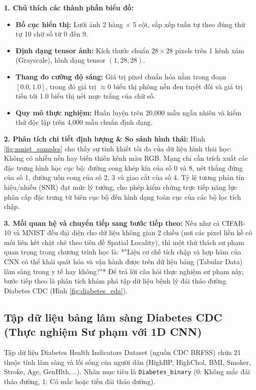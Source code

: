 \documentclass[12pt,a4paper]{article}
\begin{document}
\begin{chartbox}[title={Chú thích \& Phân tích chuyên sâu Mẫu dữ liệu MNIST (Hình \ref{fig:mnist_samples})}]
\textbf{\color{blue!80!black}1. Chú thích các thành phần biểu đồ:}
\begin{itemize}[noitemsep,topsep=1pt,leftmargin=15pt]
    \item \textbf{Bố cục hiển thị:} Lưới ảnh 2 hàng $\times$ 5 cột, sắp xếp tuần tự theo đúng thứ tự 10 chữ số từ 0 đến 9.
    \item \textbf{Định dạng tensor ảnh:} Kích thước chuẩn $28 \times 28$ pixels trên 1 kênh xám (Grayscale), hình dạng tensor $(1, 28, 28)$.
    \item \textbf{Thang đo cường độ sáng:} Giá trị pixel chuẩn hóa nằm trong đoạn $[0.0, 1.0]$, trong đó giá trị $\approx 0$ biểu thị phông nền đen tuyệt đối và giá trị tiến tới 1.0 biểu thị nét mực trắng của chữ số.
    \item \textbf{Quy mô thực nghiệm:} Huấn luyện trên 20,000 mẫu ngẫu nhiên và kiểm thử độc lập trên 4,000 mẫu chuẩn định dạng.
\end{itemize}

\vspace{1mm}
\textbf{\color{blue!80!black}2. Phân tích chi tiết định lượng \& So sánh hình thái:}
Hình \ref{fig:mnist_samples} cho thấy sự tinh khiết tối đa của dữ liệu hình thái học: Không có nhiễu nền hay biến thiên kênh màu RGB. Mạng chỉ cần trích xuất các đặc trưng hình học cục bộ: đường cong khép kín của số 0 và 8, nét thẳng đứng của số 1, đường uốn cong của số 2, 3 và giao cắt của số 4. Tỷ lệ tương phản tín hiệu/nhiễu (SNR) đạt mức lý tưởng, cho phép kiểm chứng trực tiếp năng lực phân cấp đặc trưng từ biên cục bộ đến hình dạng toàn cục của các bộ lọc tích chập.

\vspace{1mm}
\textbf{\color{blue!80!black}3. Mối quan hệ và chuyển tiếp sang bước tiếp theo:}
Nếu như cả CIFAR-10 và MNIST đều đại diện cho dữ liệu không gian 2 chiều (nơi các pixel liền kề có mối liên kết chặt chẽ theo tiên đề Spatial Locality), thì một thử thách sư phạm quan trọng trong chương trình học là: *"Liệu cơ chế tích chập và hợp hàm của CNN có thể khái quát hóa và vận hành được trên dữ liệu bảng (Tabular Data) lâm sàng trong y tế hay không?"* Để trả lời câu hỏi thực nghiệm sư phạm này, bước tiếp theo là phân tích khám phá tập dữ liệu bệnh lý đái tháo đường Diabetes CDC (Hình \ref{fig:diabetes_eda}).
\end{chartbox}

\subsection{Tập dữ liệu bảng lâm sàng Diabetes CDC (Thực nghiệm Sư phạm với 1D CNN)}
Tập dữ liệu Diabetes Health Indicators Dataset (nguồn CDC BRFSS) chứa 21 thuộc tính lâm sàng và lối sống của người dân (HighBP, HighChol, BMI, Smoker, Stroke, Age, GenHlth,...). Nhãn mục tiêu là \texttt{Diabetes\_binary} (0: Không mắc đái tháo đường, 1: Có mắc hoặc tiền đái tháo đường).
\end{document}
